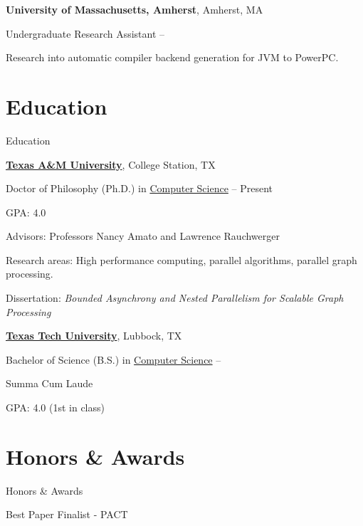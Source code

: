 \documentclass[a4paper,10pt,oneside]{article}
\begin{document}
\begin{body}
\textbf{University of Massachusetts, Amherst}, Amherst, MA
\par
Undergraduate Research Assistant
\hfill
{} --
\begin{detail}
Research into automatic compiler backend generation for JVM to PowerPC.
\end{detail}


\section{Education}
{Education}

\href{http://www.tamu.edu}
{\textbf{Texas A\&M University}},
College Station, TX

\SmallEntryGap
Doctor of Philosophy (Ph.D.) in
\href{http://cse.tamu.edu}
{Computer Science}
\hfill
{} --
Present
\begin{detail}
\begin{detail}
GPA: 4.0
\end{detail}
Advisors:
Professors Nancy Amato and Lawrence Rauchwerger
\par
Research areas:
High performance computing, parallel algorithms, parallel graph processing.
\par
Dissertation: \emph{Bounded Asynchrony and Nested Parallelism for Scalable Graph Processing}
\end{detail}

\EntryGap
\href{http://www.ttu.edu}
{\textbf{Texas Tech University}},
Lubbock, TX
\par
Bachelor of Science (B.S.) in
\href{http://cs.ttu.edu}
{Computer Science}
\hfill
{} --
\begin{detail}
Summa Cum Laude
\par
GPA: 4.0 (1st in class)
\end{detail}



\section{Honors \& Awards}
{Honors\newline
\& Awards}

Best Paper Finalist - PACT
\hfill
{}


\end{body}
\end{document}

